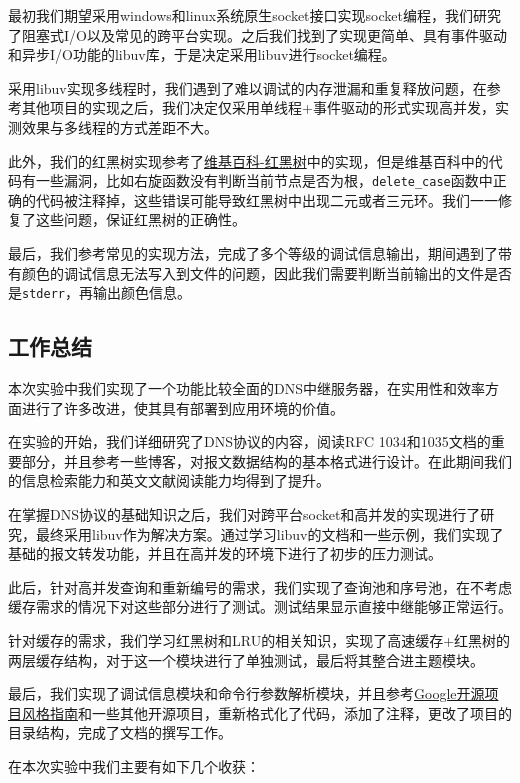 \documentclass[lang=cn,11pt,a4paper,cite=authornum]{paper}
\begin{document}
最初我们期望采用windows和linux系统原生socket接口实现socket编程，我们研究了阻塞式I/O以及常见的跨平台实现。之后我们找到了实现更简单、具有事件驱动和异步I/O功能的libuv库，于是决定采用libuv进行socket编程。

采用libuv实现多线程时，我们遇到了难以调试的内存泄漏和重复释放问题，在参考其他项目的实现之后，我们决定仅采用单线程+事件驱动的形式实现高并发，实测效果与多线程的方式差距不大。

此外，我们的红黑树实现参考了\href{https://zh.wikipedia.org/wiki/%E7%BA%A2%E9%BB%91%E6%A0%91}{维基百科-红黑树}中的实现，但是维基百科中的代码有一些漏洞，比如右旋函数没有判断当前节点是否为根，\texttt{delete_case}函数中正确的代码被注释掉，这些错误可能导致红黑树中出现二元或者三元环。我们一一修复了这些问题，保证红黑树的正确性。

最后，我们参考常见的实现方法，完成了多个等级的调试信息输出，期间遇到了带有颜色的调试信息无法写入到文件的问题，因此我们需要判断当前输出的文件是否是\texttt{stderr}，再输出颜色信息。

\subsection{工作总结}

本次实验中我们实现了一个功能比较全面的DNS中继服务器，在实用性和效率方面进行了许多改进，使其具有部署到应用环境的价值。

在实验的开始，我们详细研究了DNS协议的内容，阅读RFC 1034和1035文档的重要部分，并且参考一些博客，对报文数据结构的基本格式进行设计。在此期间我们的信息检索能力和英文文献阅读能力均得到了提升。

在掌握DNS协议的基础知识之后，我们对跨平台socket和高并发的实现进行了研究，最终采用libuv作为解决方案。通过学习libuv的文档和一些示例，我们实现了基础的报文转发功能，并且在高并发的环境下进行了初步的压力测试。

此后，针对高并发查询和重新编号的需求，我们实现了查询池和序号池，在不考虑缓存需求的情况下对这些部分进行了测试。测试结果显示直接中继能够正常运行。

针对缓存的需求，我们学习红黑树和LRU的相关知识，实现了高速缓存+红黑树的两层缓存结构，对于这一个模块进行了单独测试，最后将其整合进主题模块。

最后，我们实现了调试信息模块和命令行参数解析模块，并且参考\href{https://zh-google-styleguide.readthedocs.io/en/latest/google-cpp-styleguide/contents/}{Google开源项目风格指南}和一些其他开源项目，重新格式化了代码，添加了注释，更改了项目的目录结构，完成了文档的撰写工作。

在本次实验中我们主要有如下几个收获：
\end{document}
